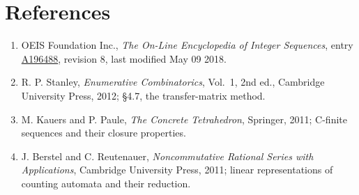 \documentclass[11pt]{article}
\theoremstyle{definition}
\begin{document}
\section{References}

\begin{enumerate}

\item OEIS Foundation Inc., \emph{The On-Line Encyclopedia of Integer Sequences}, entry \href{https://oeis.org/A196488}{A196488}, revision 8, last modified May 09 2018.

\item R. P. Stanley, \emph{Enumerative Combinatorics}, Vol.~1, 2nd ed., Cambridge University Press, 2012; \S4.7, the transfer-matrix method.

\item M. Kauers and P. Paule, \emph{The Concrete Tetrahedron}, Springer, 2011; C-finite sequences and their closure properties.

\item J. Berstel and C. Reutenauer, \emph{Noncommutative Rational Series with Applications}, Cambridge University Press, 2011; linear representations of counting automata and their reduction.

\end{enumerate}
\end{document}
